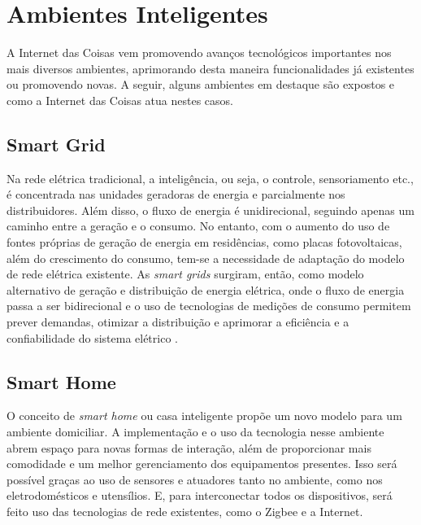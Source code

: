 


\section{Ambientes Inteligentes}

A Internet das Coisas vem promovendo avanços tecnológicos importantes nos mais diversos ambientes, aprimorando desta maneira funcionalidades já existentes ou promovendo novas. A seguir, alguns ambientes em destaque são expostos e como a Internet das Coisas atua nestes casos. 

\subsection{Smart Grid}

Na rede elétrica tradicional, a inteligência, ou seja, o controle, sensoriamento etc., é concentrada nas unidades geradoras de energia e parcialmente nos distribuidores. Além disso, o fluxo de energia é unidirecional, seguindo apenas um caminho entre a geração e o consumo. No entanto, com o aumento do uso de fontes próprias de geração de energia em residências, como placas fotovoltaicas, além do crescimento do consumo, tem-se a necessidade de adaptação do modelo de rede elétrica existente. As \textit{smart grids} surgiram, então, como modelo alternativo de geração e distribuição de energia elétrica, onde o fluxo de energia passa a ser bidirecional e o uso de tecnologias de medições de consumo permitem prever demandas, otimizar a distribuição e aprimorar a eficiência e a confiabilidade do sistema elétrico \cite{Cecilia2016}. 


\subsection{Smart Home}

O conceito de \textit{smart home} ou casa inteligente propõe um novo modelo para um ambiente domiciliar. A implementação e o uso da tecnologia nesse ambiente abrem espaço para novas formas de interação, além de proporcionar mais comodidade e um melhor gerenciamento dos equipamentos presentes. Isso será possível graças ao uso de sensores e atuadores tanto no ambiente, como nos eletrodomésticos e utensílios. E, para interconectar todos os dispositivos, será feito uso das tecnologias de rede existentes, como o Zigbee e a Internet.

